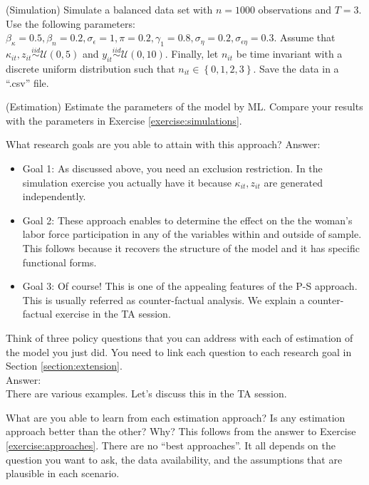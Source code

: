 \begin{exercise} (Simulation) \label{exercise:simulations}
Simulate a balanced data set with $n = 1000$ observations and $T=3$. Use the following parameters: $\beta_\kappa = 0.5, \beta_n = 0.2, \sigma_\epsilon = 1, \pi = 0.2, \gamma_1 = 0.8, \sigma_\eta = 0.2, \sigma_{\epsilon \eta} = 0.3$. Assume that $\kappa_{it},z_{it} \overset{iid}{\sim} \mathcal{U} (0,5)$ and $y_{it} \overset{iid}{\sim} \mathcal{U} (0,10)$. Finally, let $n_{it}$ be time invariant with a discrete uniform distribution such that $n_{it} \in \left\{0,1,2,3\right\}$. Save the data in a ``.csv'' file.
\end{exercise}

\begin{exercise} (Estimation)
Estimate the parameters of the model by ML. Compare your results with the parameters in Exercise \ref{exercise:simulations}.
\end{exercise}

\begin{exercise} \label{exercise:psapproach}
What research goals are you able to attain with this approach?
\noindent Answer:\\
\begin{itemize}
\item Goal 1: As discussed above, you need an exclusion restriction. In the simulation exercise you actually have it because $\kappa_{it},z_{it}$ are generated independently.
\item Goal 2: These approach enables to determine the effect on the the woman's labor force participation in any of the variables within and outside of sample. This follows because it recovers the structure of the model and it has specific functional forms. 
\item Goal 3: Of course! This is one of the appealing features of the P-S approach. This is usually referred as counter-factual analysis. We explain a counter-factual exercise in the TA session.  
\end{itemize}
 
\end{exercise}

\begin{exercise}
Think of three policy questions that you can address with each of estimation of the model you just did. You need to link each question to each research goal in Section \ref{section:extension}.\\
\noindent Answer:\\
\noindent There are various examples. Let's discuss this in the TA session.
\end{exercise}

\begin{exercise}
What are you able to learn from each estimation approach? Is any estimation approach better than the other? Why? This follows from the answer to Exercise \ref{exercise:approaches}. There are no ``best approaches''. It all depends on the question you want to ask, the data availability, and the assumptions that are plausible in each scenario.
\end{exercise}